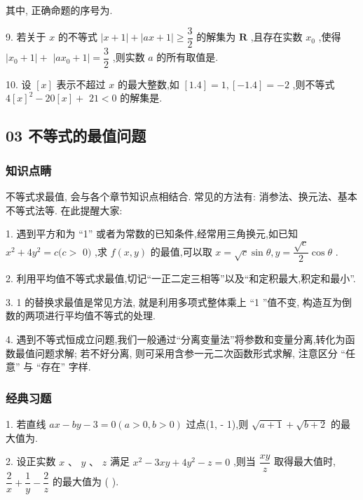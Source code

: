 其中, 正确命题的序号为\blkda{}.

9. 若关于 $x$ 的不等式 $\left| {x + 1}\right|  + \left| {{ax} + 1}\right|  \geq  \dfrac{3}{2}$ 的解集为 $\mathbf{R}$ ,且存在实数 ${x}_{0}$ ,使得 $\left| {{x}_{0} + 1}\right|  +$  $\left| {a{x}_{0} + 1}\right|  = \dfrac{3}{2}$ ,则实数 $a$ 的所有取值是\blkda{}.

10. 设 $\left\lbrack  x\right\rbrack$ 表示不超过 $x$ 的最大整数,如 $\left\lbrack  {1.4}\right\rbrack   = 1,\left\lbrack  {-{1.4}}\right\rbrack   =  - 2$ ,则不等式 $4{\left\lbrack  x\right\rbrack  }^{2} - {20}\left\lbrack  x\right\rbrack   +$  ${21} < 0$ 的解集是\blkda{}.

\subsection*{03 不等式的最值问题}

\subsubsection*{知识点睛}

不等式求最值, 会与各个章节知识点相结合. 常见的方法有: 消参法、换元法、基本不等式法等. 在此提醒大家:

1. 遇到平方和为 “1” 或者为常数的已知条件,经常用三角换元,如已知 ${x}^{2} + 4{y}^{2} = c(c >$  $0)$ ,求 $f\left( {x,y}\right)$ 的最值,可以取 $x = \sqrt{c}\sin \theta ,y = \dfrac{\sqrt{c}}{2}\cos \theta$ .

2. 利用平均值不等式求最值,切记“一正二定三相等”以及“和定积最大,积定和最小”.

3. 1 的替换求最值是常见方法, 就是利用多项式整体乘上 “1 ”值不变, 构造互为倒数的两项进行平均值不等式的处理.

4. 遇到不等式恒成立问题,我们一般通过“分离变量法”将参数和变量分离,转化为函数最值问题求解; 若不好分离, 则可采用含参一元二次函数形式求解, 注意区分 “任意” 与 “存在” 字样.

\subsubsection*{经典习题}

1. 若直线 ${ax} - {by} - 3 = 0\left( {a > 0,b > 0}\right)$ 过点(1, - 1),则 $\sqrt{a + 1} + \sqrt{b + 2}$ 的最大值为\blkda{}.

2. 设正实数 $x\text{ 、 }y\text{ 、 }z$ 满足 ${x}^{2} - {3xy} + 4{y}^{2} - z = 0$ ,则当 $\dfrac{xy}{z}$ 取得最大值时, $\dfrac{2}{x} + \dfrac{1}{y} - \dfrac{2}{z}$ 的最大值为 (   ).

